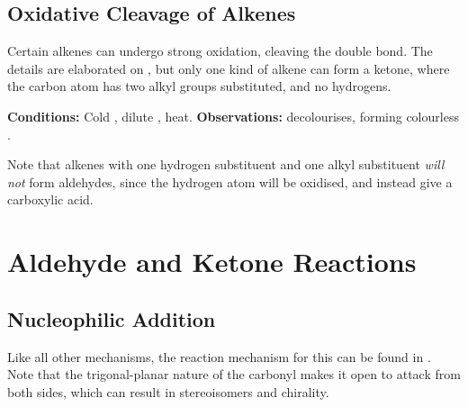 		\pagebreak
		\subsection{Oxidative Cleavage of Alkenes}

			Certain alkenes can undergo strong oxidation, cleaving the double bond. The details are elaborated on
			\hyperlink{OxidativeCleavageOfAlkenes}{}, but only one kind of alkene can form a ketone, where the carbon
			atom has two alkyl groups substituted, and no hydrogens.

			\vspace{1.5em}
			\vbox{\textbf{Conditions:}	\tabto{35mm}Cold , dilute , heat.}	%
			\vbox{\textbf{Observations:}  decolourises, forming colourless .}



			Note that alkenes with one hydrogen substituent and one alkyl substituent \textit{will not} form aldehydes, since the hydrogen
			atom will be oxidised, and instead give a carboxylic acid.



	\pagebreak
	\section{Aldehyde and Ketone Reactions}

		\subsection{Nucleophilic Addition}

			Like all other mechanisms, the reaction mechanism for this can be found in
			\hyperlink{AppendixNucleophilicAddition}{}. Note that the trigonal-planar nature of the carbonyl makes it
			open to attack from both sides, which can result in stereoisomers and chirality.



